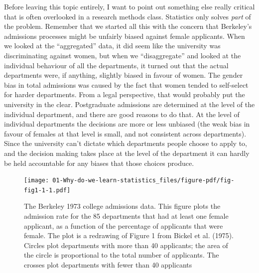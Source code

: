 \documentclass[
  a4paper,
]{book}
\begin{document}
Before leaving this topic entirely, I want to point out something else
really critical that is often overlooked in a research methods class.
Statistics only solves \emph{part} of the problem. Remember that we
started all this with the concern that Berkeley's admissions processes
might be unfairly biased against female applicants. When we looked at
the ``aggregated'' data, it did seem like the university was
discriminating against women, but when we ``disaggregate'' and looked at
the individual behaviour of all the departments, it turned out that the
actual departments were, if anything, slightly biased in favour of
women. The gender bias in total admissions was caused by the fact that
women tended to self-select for harder departments. From a legal
perspective, that would probably put the university in the clear.
Postgraduate admissions are determined at the level of the individual
department, and there are good reasons to do that. At the level of
individual departments the decisions are more or less unbiased (the weak
bias in favour of females at that level is small, and not consistent
across departments). Since the university can't dictate which
departments people choose to apply to, and the decision making takes
place at the level of the department it can hardly be held accountable
for any biases that those choices produce.

\begin{figure}

\texttt{[image: 01-Why-do-we-learn-statistics\_files/figure-pdf/fig-fig1-1-1.pdf]} \hfill{}

\caption{\label{fig-fig1-1}The Berkeley 1973 college admissions data.
This figure plots the admission rate for the 85 departments that had at
least one female applicant, as a function of the percentage of
applicants that were female. The plot is a redrawing of Figure 1 from
Bickel et al. (1975). Circles plot departments with more than 40
applicants; the area of the circle is proportional to the total number
of applicants. The crosses plot departments with fewer than 40
applicants}

\end{figure}
\end{document}
